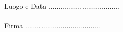 \documentclass[10pt]{letter}
\begin{document}
\begin{enumerate}
\end{enumerate}

~\\
~\\
Luogo e Data .................................... \\ \\

Firma ......................................
\end{document}
